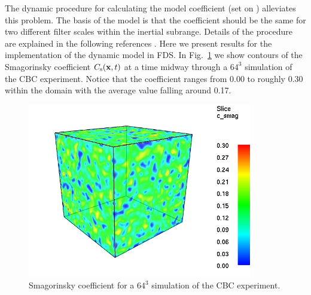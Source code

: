 \documentclass[11pt]{book}
\begin{document}
The dynamic procedure for calculating the model coefficient (set  on ) alleviates this problem.  The basis of the model is that the coefficient should be the same for two different filter scales within the inertial subrange.  Details of the procedure are explained in the following references \cite{Germano:1991,PinoMartin:2000,Moin:1991,Lund:1997,FDS_Math_Guide}.  Here we present results for the implementation of the dynamic model in FDS.  In Fig.~\ref{fig_c_smag} we show contours of the Smagorinsky coefficient $C_{\rm s}(\mathbf{x},t)$ at a time midway through a $64^3$ simulation of the CBC experiment.  Notice that the coefficient ranges from 0.00 to roughly 0.30 within the domain with the average value falling around 0.17.

\begin{figure}[t]
\centering
\includegraphics[height=3.00in]{SCRIPT_FIGURES/dsmag_64_300}
\caption[Dynamic Smagorinsky coefficient]{Smagorinsky coefficient for a $64^3$ simulation of the CBC experiment.}
\label{fig_c_smag}
\end{figure}
\end{document}
